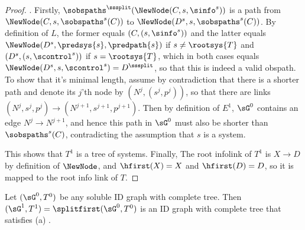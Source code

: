 \begin{proof}
    . 
    Firstly, $\sobspaths^{\sssplit}(\NewNode(C,s,\sinfo^{s}))$ is a path from $\NewNode(C, s,\sobspaths^{s}(C))$ to $\NewNode(D^s,s,\sobspaths^{s}(C))$. By definition of $L$, the former equals $(C,(s,\sinfo^{s}))$ and the latter equals $\NewNode(D^s,\predsys{s},\predpath{s})$ if $s\neq \rootsys{T}$ and $(D^s,(s,\scontrol^s))$ if $s=\rootsys{T}$, which in both cases equals $\NewNode(D^s, s,\scontrol^s)=D^{\sssplit}$, so that this is indeed a valid obspath. To show that it's minimal length, assume by contradiction that there is a shorter path and denote its $j$'th node by $(N^j,(s^j,p^j))$, so that there are links $(N^j,s^j,p^j)\to (N^{j+1},s^{j+1},p^{j+1})$. Then by definition of $E^1$, $\sG^0$ contains an edge $N^j\to N^{j+1}$, and hence this path in $\sG^0$ must also be shorter than $\sobspaths^s(C)$, contradicting the assumption that $s$ is a system.
    
This shows that $T^1$ is a tree of systems. Finally, The root infolink of $T^1$ is $X\to D$ by definition of $\NewNode$, and $\hfirst(X)=X$ and $\hfirst(D)=D$, so it is mapped to the root info link of $T$.
\end{proof}



















\begin{lemma}
\label{le:21jan26.1-first-split-ensures-systems-and-paths-uniqueness}
Let $(\sG^0,T^0)$ be any soluble ID graph with complete tree. Then $(\sG^1,T^1)=\splitfirst(\sG^0,T^0)$ is an ID graph with complete tree that satisfies (a) \systemsAndPathsUniqueness.
\end{lemma}

